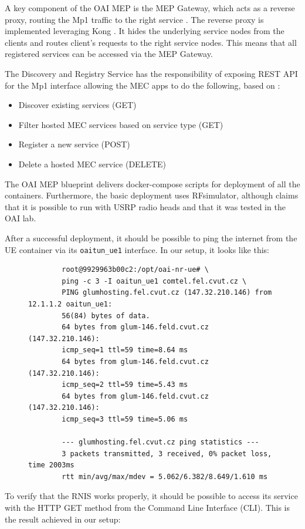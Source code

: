 \documentclass[12pt,a4paper,twoside]{report}
\begin{document}
A key component of the OAI MEP is the MEP Gateway, which acts as a reverse proxy, routing the Mp1 traffic to the right service \cite{oai-mep-git}. The reverse proxy is implemented leveraging Kong \cite{kong-docu}. It hides the underlying service nodes from the clients and routes client’s requests to the right service nodes. This means that all registered services can be accessed via the MEP Gateway.

The Discovery and Registry Service has the responsibility of exposing REST API for the Mp1 interface allowing the MEC apps to do the following, based on \cite{oai-mep-git}:
%
\begin{itemize}[itemsep=2pt]
	\item Discover existing services (GET)
	\item Filter hosted MEC services based on service type (GET)
	\item Register a new service (POST)
	\item Delete a hosted MEC service (DELETE)
\end{itemize}
%
The OAI MEP blueprint delivers docker-compose scripts for deployment of all the containers. Furthermore, the basic deployment uses RFsimulator, although \cite{oai-blueprint-git} claims that it is possible to run with USRP radio heads and that it was tested in the OAI lab. 

After a successful deployment, it should be possible to ping the internet from the UE container via its \verb|oaitun_ue1| interface. In our setup, it looks like this:

\begin{figure}[H]
	\begin{verbatim}
		root@9929963b00c2:/opt/oai-nr-ue# \
		ping -c 3 -I oaitun_ue1 comtel.fel.cvut.cz \
		PING glumhosting.fel.cvut.cz (147.32.210.146) from 12.1.1.2 oaitun_ue1:
		56(84) bytes of data.
		64 bytes from glum-146.feld.cvut.cz (147.32.210.146):
		icmp_seq=1 ttl=59 time=8.64 ms
		64 bytes from glum-146.feld.cvut.cz (147.32.210.146):
		icmp_seq=2 ttl=59 time=5.43 ms
		64 bytes from glum-146.feld.cvut.cz (147.32.210.146):
		icmp_seq=3 ttl=59 time=5.06 ms
	
		--- glumhosting.fel.cvut.cz ping statistics ---
		3 packets transmitted, 3 received, 0% packet loss, time 2003ms
		rtt min/avg/max/mdev = 5.062/6.382/8.649/1.610 ms
	\end{verbatim}	
\end{figure}

To verify that the RNIS works properly, it should be possible to access its service with the HTTP GET method from the Command Line Interface (CLI). This is the result achieved in our setup:
\end{document}
